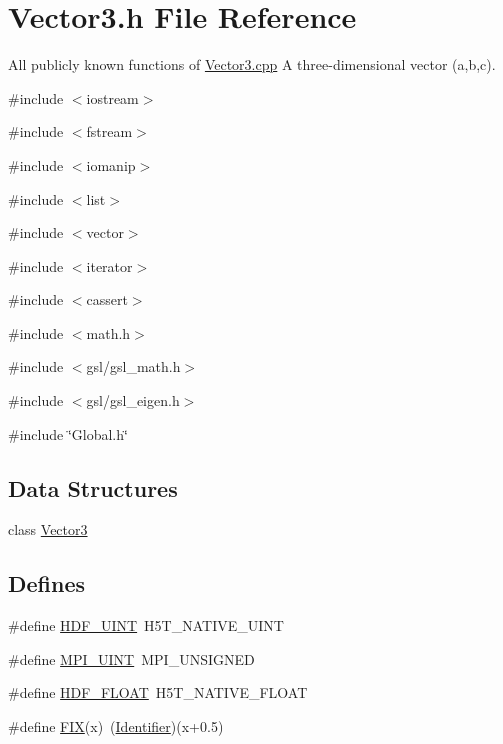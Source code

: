 \section{Vector3.h File Reference}
\label{Vector3_8h}


All publicly known functions of \hyperlink{Vector3_8cpp}{Vector3.cpp} A three-\/dimensional vector (a,b,c).  


{\ttfamily \#include $<$iostream$>$}\par
{\ttfamily \#include $<$fstream$>$}\par
{\ttfamily \#include $<$iomanip$>$}\par
{\ttfamily \#include $<$list$>$}\par
{\ttfamily \#include $<$vector$>$}\par
{\ttfamily \#include $<$iterator$>$}\par
{\ttfamily \#include $<$cassert$>$}\par
{\ttfamily \#include $<$math.h$>$}\par
{\ttfamily \#include $<$gsl/gsl\_\-math.h$>$}\par
{\ttfamily \#include $<$gsl/gsl\_\-eigen.h$>$}\par
{\ttfamily \#include \char`\"{}Global.h\char`\"{}}\par
\subsection*{Data Structures}
\begin{DoxyCompactItemize}
\item 
class \hyperlink{classVector3}{Vector3}
\end{DoxyCompactItemize}
\subsection*{Defines}
\begin{DoxyCompactItemize}
\item 
\#define \hyperlink{Vector3_8h_ac366362734c04742f3c0777e399648af}{HDF\_\-UINT}~H5T\_\-NATIVE\_\-UINT
\item 
\#define \hyperlink{Vector3_8h_a36f55c7359c730c7b6be07a113c6af7b}{MPI\_\-UINT}~MPI\_\-UNSIGNED
\item 
\#define \hyperlink{Vector3_8h_a669eec24b7fa0bce364dc2d08724da7b}{HDF\_\-FLOAT}~H5T\_\-NATIVE\_\-FLOAT
\item 
\#define \hyperlink{Vector3_8h_a740431a9a1d25e39e670cd5f48454ce4}{FIX}(x)~(\hyperlink{Vector3_8h_a25e0b8ddd193bb84ebf6c0eeff6b1c82}{Identifier})(x+0.5)
\end{DoxyCompactItemize}
